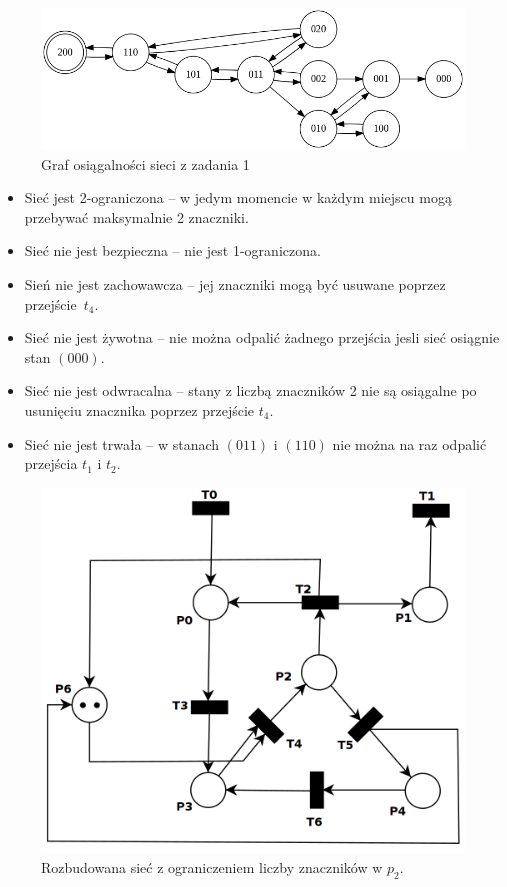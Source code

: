 \documentclass[12pt]{article}
\begin{document}
\begin{figure}[h]
    \centering
    \includegraphics[width=\linewidth]{../../lab6/graph.dot.png}
    \caption{Graf osiągalności sieci z zadania 1}
\end{figure}


\begin{itemize}[noitemsep]
    \item Sieć jest 2-ograniczona -- w jedym momencie w każdym miejscu mogą przebywać maksymalnie 2 znaczniki.
    \item Sieć nie jest bezpieczna -- nie jest 1-ograniczona.
    \item Sień nie jest zachowawcza -- jej znaczniki mogą być usuwane poprzez przejście~$t_4$.
    \item Sieć nie jest żywotna -- nie można odpalić żadnego przejścia jesli sieć osiągnie stan $(000)$.
    \item Sieć nie jest odwracalna -- stany z liczbą znaczników 2 nie są osiągalne po usunięciu znacznika poprzez przejście $t_4$.
    \item Sieć nie jest trwała -- w stanach $(011)$ i $(110)$ nie można na raz odpalić przejścia $t_1$ i $t_2$.
\end{itemize}

\newpage


\begin{figure}[h]
    \centering
    \includegraphics[width=0.8\linewidth]{../../lab6/ex_4}
    \caption{Rozbudowana sieć z ograniczeniem liczby znaczników w $p_2$.}
\end{figure}
\end{document}
